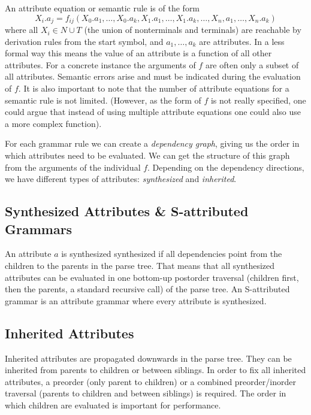 \documentclass{article}
\begin{document}
An attribute equation or semantic rule is of the form
\begin{equation}
	X_i.a_j = f_{ij}(X_0.a_1, \dots, X_0.a_k, X_1.a_1, \dots, X_1.a_k, \dots, X_n, a_1, \dots, X_n.a_k)
\end{equation}
where all $X_i \in N \cup T$ (the union of nonterminals and terminals) are reachable by derivation rules from the start symbol, and $a_1, \dots, a_k$ are attributes.
In a less formal way this means the value of an attribute is a function of all other attributes.
For a concrete instance the arguments of $f$ are often only a subset of all attributes.
Semantic errors arise and must be indicated during the evaluation of $f$.
It is also important to note that the number of attribute equations for a semantic rule is not limited.
(However, as the form of $f$ is not really specified, one could argue that instead of using multiple attribute equations one could also use a more complex function).

For each grammar rule we can create a \emph{dependency graph}, giving us the order in which attributes need to be evaluated.
We can get the structure of this graph from the arguments of the individual $f$.
Depending on the dependency directions, we have different types of attributes: \emph{synthesized} and \emph{inherited}.

\subsection{Synthesized Attributes \& S-attributed Grammars}
An attribute $a$ is synthesized synthesized if all dependencies point from the children to the parents in the parse tree.
That means that all synthesized attributes can be evaluated in one bottom-up postorder traversal (children first, then the parents, a standard recursive call) of the parse tree.
An S-attributed grammar is an attribute grammar where every attribute is synthesized.

\subsection{Inherited Attributes}
Inherited attributes are propagated downwards in the parse tree.
They can be inherited from parents to children or between siblings.
In order to fix all inherited attributes, a preorder (only parent to children) or a combined preorder/inorder traversal (parents to children and between siblings) is required.
The order in which children are evaluated is important for performance.
\end{document}
